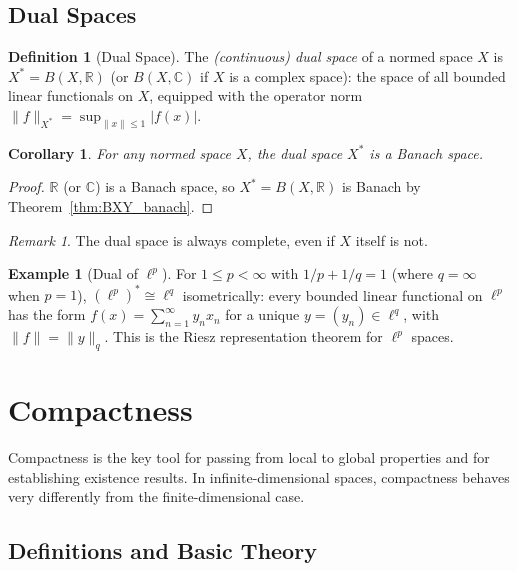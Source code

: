 \documentclass[11pt,a4paper]{article}
\theoremstyle{definition}
\newtheorem{definition}{Definition}[section]
\newtheorem{example}{Example}[section]
\theoremstyle{plain}
\newtheorem{corollary}[theorem]{Corollary}
\theoremstyle{remark}
\newtheorem{remark}{Remark}[section]
\newcommand{\R}{\mathbb{R}}
\newcommand{\C}{\mathbb{C}}
\begin{document}
\subsection{Dual Spaces}

\begin{definition}[Dual Space]
\label{def:dual}
The \emph{(continuous) dual space} of a normed space $X$ is
$X^* = B(X, \R)$ (or $B(X, \C)$ if $X$ is a complex space): the space of all
bounded linear functionals on $X$, equipped with the operator norm
$\|f\|_{X^*} = \sup_{\|x\| \le 1} |f(x)|$.
\end{definition}

\begin{corollary}
\label{cor:dual_banach}
For any normed space $X$, the dual space $X^*$ is a Banach space.
\end{corollary}

\begin{proof}
$\R$ (or $\C$) is a Banach space, so $X^* = B(X, \R)$ is Banach by
Theorem~\ref{thm:BXY_banach}.
\end{proof}

\begin{remark}
The dual space is always complete, even if $X$ itself is not.
\end{remark}

\begin{example}[Dual of $\ell^p$]
\label{ex:dual_lp}
For $1 \le p < \infty$ with $1/p + 1/q = 1$ (where $q = \infty$ when $p = 1$),
$(\ell^p)^* \cong \ell^q$ isometrically: every bounded linear functional on
$\ell^p$ has the form $f(x) = \sum_{n=1}^\infty y_n x_n$ for a unique
$y = (y_n) \in \ell^q$, with $\|f\| = \|y\|_q$. This is the Riesz representation
theorem for $\ell^p$ spaces.
\end{example}

\section{Compactness}
\label{sec:compactness}

Compactness is the key tool for passing from local to global properties and for
establishing existence results. In infinite-dimensional spaces, compactness
behaves very differently from the finite-dimensional case.

\subsection{Definitions and Basic Theory}
\end{document}
